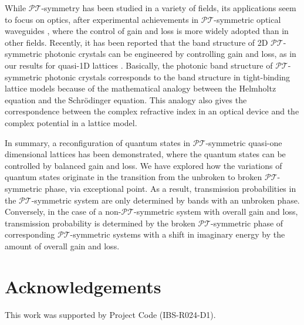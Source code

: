 \documentclass[report,epsfig,pre]{revtex4}
\begin{document}
While $\mathcal{PT}$-symmetry has been studied in a variety of fields, its applications seem to focus on optics, after experimental achievements in $\mathcal{PT}$-symmetric optical waveguides \cite{Guo09, Rue10}, where the control of gain and loss is more widely adopted than in other fields. Recently, it has been reported that the band structure of 2D $\mathcal{PT}$-symmetric photonic crystals can be engineered by controlling gain and loss, as in our results for quasi-1D lattices \cite{Cer16}. Basically, the photonic band structure of $\mathcal{PT}$-symmetric photonic crystals corresponds to the band structure in tight-binding lattice models because of the mathematical analogy between the Helmholtz equation and the Schr{\"o}dinger equation. This analogy also gives the correspondence between the complex refractive index in an optical device and the complex potential in a lattice model.

In summary, a reconfiguration of quantum states in $\mathcal{PT}$-symmetric quasi-one dimensional lattices has been demonstrated, where the quantum states can be controlled by balanced gain and loss. We have explored how the variations of quantum states originate in the transition from the unbroken to broken $\mathcal{PT}$-symmetric phase, via exceptional point. As a result, transmission probabilities in the $\mathcal{PT}$-symmetric system are only determined by bands with an unbroken phase. Conversely, in the case of a non-$\mathcal{PT}$-symmetric system with overall gain and loss, transmission probability is determined by the broken $\mathcal{PT}$-symmetric phase of corresponding $\mathcal{PT}$-symmetric systems with a shift in imaginary energy by the amount of overall gain and loss.



\section*{Acknowledgements}

This work was supported by Project Code (IBS-R024-D1).
\end{document}
